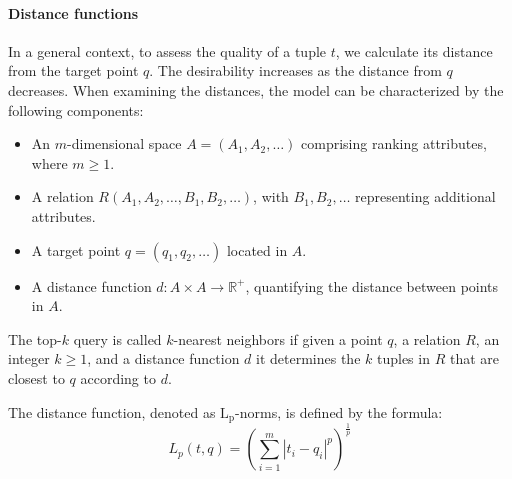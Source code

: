 \paragraph*{Distance functions}
In a general context, to assess the quality of a tuple $t$, we calculate its distance from the target point $q$. 
The desirability increases as the distance from $q$ decreases. 
When examining the distances, the model can be characterized by the following components:
\begin{itemize}
    \item An $m$-dimensional space $A = (A_1, A_2, \dots)$ comprising ranking attributes, where $m \geq 1$.
    \item A relation $R(A_1, A_2, \dots, B_1, B_2, \dots)$, with $B_1, B_2, \dots$ representing additional attributes.
    \item A target point $q = (q_1, q_2, \dots)$ located in $A$.
    \item A distance function $d: A \times A \rightarrow \mathbb{R}^{+}$, quantifying the distance between points in $A$.
\end{itemize}
\begin{definition}
    The top-$k$ query is called $k$-nearest neighbors if given a point $q$, a relation $R$, an integer $k \geq 1$, and a distance function $d$ it determines the $k$ tuples in $R$ that are closest to $q$ according to $d$. 
\end{definition}
\begin{definition}
    The distance function, denoted as $\text{L}_{\text{p}}$-norms, is defined by the formula:
    \[L_p(t,q)=\left(\sum_{i=1}^{m}{\left\lvert t_i-q_i \right\rvert^{p}}\right)^{\frac{1}{p}}\]
\end{definition}

